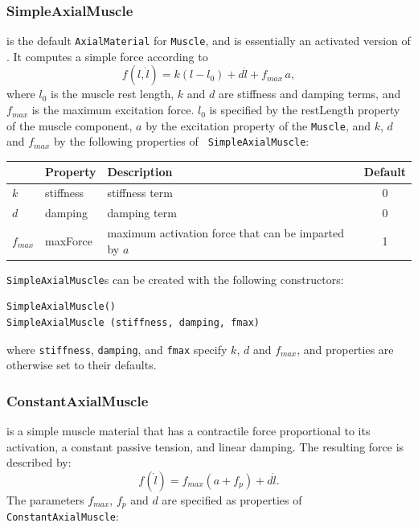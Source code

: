 \subsubsection{SimpleAxialMuscle}
\label{SimpleAxialMuscle:sec}

 is the default
{\tt AxialMaterial} for {\tt Muscle}, and is essentially an activated
version of .
It computes a simple force according to
%
\begin{equation}
f(l, \dot l) = k (l-l_0) + d \dot l + f_{max} \, a,
\label{SimpleAxialMuscle:eqn}
\end{equation}
%
where $l_0$ is the muscle rest length, $k$ and $d$ are stiffness and
damping terms, and $f_{max}$ is the maximum excitation force. $l_0$ is
specified by the {\sf restLength} property of the muscle component,
$a$ by the {\sf excitation} property of the {\tt Muscle}, and $k$, $d$
and $f_{max}$ by the following properties of {\tt
SimpleAxialMuscle}:

\begin{center}
\begin{tabular}{|l|l|l|c|} 
\hline
 & Property & Description & Default \\
\hline
$k$ & {\sf stiffness} & stiffness term & 0 \\
$d$ & {\sf damping} & damping term & 0 \\
$f_{max}$ & {\sf maxForce} & maximum activation force that can be 
imparted by $a$ & 1 \\
\hline
\end{tabular}
\end{center}

{\tt SimpleAxialMuscle}s can be created with the following
constructors:
\begin{lstlisting}[]
SimpleAxialMuscle()
SimpleAxialMuscle (stiffness, damping, fmax)
\end{lstlisting}
%
where {\tt stiffness}, {\tt damping}, and {\tt fmax} specify $k$, $d$
and $f_{max}$, and properties are otherwise set to their defaults.

\subsubsection{ConstantAxialMuscle}

is a simple muscle material that has a contractile force proportional
to its activation, a constant passive tension, and linear damping.
The resulting force is described by:
%
\begin{equation}
f(\dot l) = f_{max} ( a  +  f_{p} ) + d \dot l.
\label{ConstantAxialMaterial:eqn}
\end{equation}
%
The parameters $f_{max}$, $f_{p}$ and $d$ are specified as properties of
{\tt ConstantAxialMuscle}:

